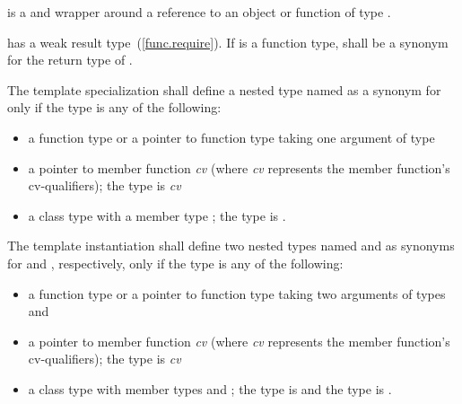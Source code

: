 \pnum
{} is a  and  wrapper
around a reference to an object or function of type .

\pnum
{} has a weak result type~(\ref{func.require}).
If  is a function type,  shall be a synonym for the
return type of .

\pnum
The template specialization  shall
define a nested type named  as a synonym for 
only if the type  is any of the
following:

\begin{itemize}
\item
a function type or a pointer to function type taking one argument of type 

\item
a pointer to member function  \textit{cv} (where \textit{cv} represents the
member function's cv-qualifiers); the type  is \textit{cv} 

\item
a class type with a member type ; the type  is
.
\end{itemize}

\pnum
The template instantiation  shall
define two nested types named  and 
as synonyms for  and , respectively,
only if the type
 is any of the following:

\begin{itemize}
\item
a function type or a pointer to function type taking two arguments of types  and

\item
a pointer to member function  \textit{cv} (where \textit{cv} represents the
member function's cv-qualifiers); the type  is \textit{cv} 

\item
a class type with member types  and
;
the type  is 
and the type  is .

\end{itemize}

